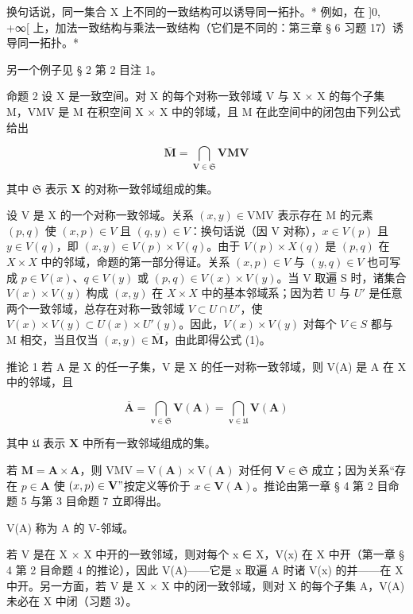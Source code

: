 换句话说，同一集合 X 上不同的一致结构可以诱导同一拓扑。* 例如，在 {]}0, +∞{[} 上，加法一致结构与乘法一致结构（它们是不同的：第三章 § 6 习题 17）诱导同一拓扑。*

另一个例子见 § 2 第 2 目注 1。

命题 2 设 X 是一致空间。对 X 的每个对称一致邻域 V 与 X × X 的每个子集 M，VMV 是 M 在积空间 X × X 中的邻域，且 M 在此空间中的闭包由下列公式给出

\[
\overline {{\mathbf {M}}} = \bigcap_ {\mathbf {V} \in \mathfrak {S}} \mathbf {V M V}\tag{I}
\]

其中 \(\mathfrak{S}\) 表示 \(\mathbf{X}\) 的对称一致邻域组成的集。

设 V 是 X 的一个对称一致邻域。关系 \((x, y) \in \text{VMV}\) 表示存在 M 的元素 \((p, q)\) 使 \((x, p) \in V\) 且 \((q, y) \in V\)：换句话说（因 V 对称），\(x \in V(p)\) 且 \(y \in V(q)\)，即 \((x, y) \in V(p) \times V(q)\)。由于 \(V(p) \times X(q)\) 是 \((p, q)\) 在 \(X \times X\) 中的邻域，命题的第一部分得证。关系 \((x, p) \in V\) 与 \((y, q) \in V\) 也可写成 \(p \in V(x)\)、\(q \in V(y)\) 或 \((p, q) \in V(x) \times V(y)\)。当 V 取遍 S 时，诸集合 \(V(x) \times V(y)\) 构成 \((x, y)\) 在 \(X \times X\) 中的基本邻域系；因为若 U 与 \(U'\) 是任意两个一致邻域，总存在对称一致邻域 \(V \subset U \cap U'\)，使 \(V(x) \times V(y) \subset U(x) \times U'(y)\)。因此，\(V(x) \times V(y)\) 对每个 \(V \in S\) 都与 M 相交，当且仅当 \((x, y) \in \overline{\mathbf{M}}\)，由此即得公式 (1)。

推论 1 若 A 是 X 的任一子集，V 是 X 的任一对称一致邻域，则 V(A) 是 A 在 X 中的邻域，且

\[
\overline {{{\mathbf {A}}}} = \bigcap_ {\mathbf {v} \in \mathfrak {S}} \mathbf {V} (\mathbf {A}) = \bigcap_ {\mathbf {v} \in \mathfrak {U}} \mathbf {V} (\mathbf {A})\tag{2}
\]

其中 \(\mathfrak{U}\) 表示 \(\mathbf{X}\) 中所有一致邻域组成的集。

若 \(\mathbf{M} = \mathbf{A} \times \mathbf{A}\)，则 \(\mathrm{VMV} = \mathrm{V}(\mathbf{A}) \times \mathrm{V}(\mathbf{A})\) 对任何 \(\mathbf{V} \in \mathfrak{S}\) 成立；因为关系“存在 \(p \in \mathbf{A}\) 使 \((x, p) \in \mathbf{V}"\)按定义等价于 \(x \in \mathbf{V}(\mathbf{A})\)。推论由第一章 § 4 第 2 目命题 5 与第 3 目命题 7 立即得出。

V(A) 称为 A 的 V-邻域。

若 V 是在 X × X 中开的一致邻域，则对每个 x ∈ X，V(x) 在 X 中开（第一章 § 4 第 2 目命题 4 的推论），因此 V(A)——它是 x 取遍 A 时诸 V(x) 的并——在 X 中开。另一方面，若 V 是 X × X 中的闭一致邻域，则对 X 的每个子集 A，V(A) 未必在 X 中闭（习题 3）。

